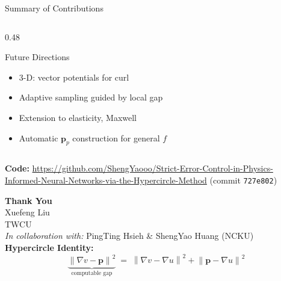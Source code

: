 \documentclass[10pt,aspectratio=169]{beamer}
\newcommand{\norm}[1]{\left\|#1\right\|}
\begin{document}
\begin{frame}{Summary of Contributions}
\begin{columns}[T]
\begin{column}{0.48\textwidth}
      \medskip
      \begin{block}{Future Directions}
        \begin{itemize}
          \item 3-D: vector potentials for curl
          \item Adaptive sampling guided by local gap
          \item Extension to elasticity, Maxwell
          \item Automatic $\mathbf{p}_p$ construction
                for general $f$
        \end{itemize}
      \end{block}
    \end{column}
  \end{columns}

  \medskip
  \begin{center}
    \small
    \textbf{Code:}
    \url{https://github.com/ShengYaooo/Strict-Error-Control-in-Physics-Informed-Neural-Networks-via-the-Hypercircle-Method}
    \quad (commit \texttt{727e802})
  \end{center}
\end{frame}

\begin{frame}[plain]
  \begin{center}
    \vspace{1.5cm}
    {\LARGE \textbf{Thank You}}\\[1cm]
    {\large Xuefeng Liu}\\[0.3cm]
    {\normalsize TWCU}\\[0.8cm]
    {\normalsize
      \emph{In collaboration with:} PingTing Hsieh \& ShengYao Huang (NCKU)}\\[1.2cm]
    \textbf{Hypercircle Identity:}
    \[
      \underbrace{\norm{\nabla v - \mathbf{p}}^2}_{\text{computable gap}}
      \;=\;
      \norm{\nabla v - \nabla u}^2 + \norm{\mathbf{p} - \nabla u}^2
    \]
  \end{center}
\end{frame}
\end{document}
